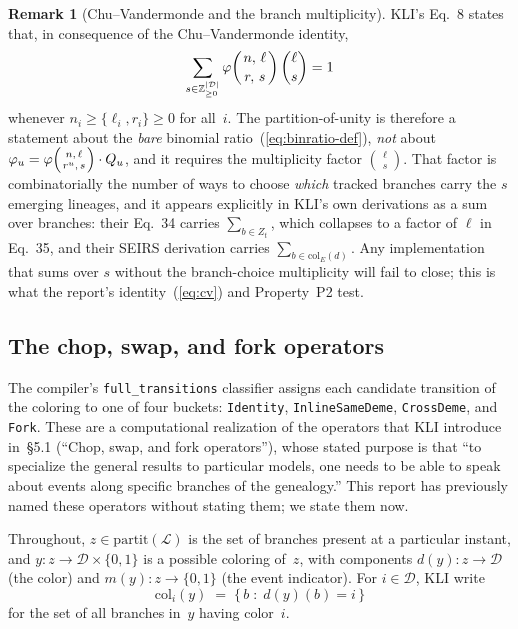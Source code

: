 \documentclass[11pt,leqno]{article}
\newcommand{\Demes}{\mathcal{D}}    %
\newcommand{\Zp}{\mathbb{Z}_{\ge 0}}
\newcommand{\binratio}[4]{\varphi\!\left(\genfrac{}{}{0pt}{}{#1,\,#2}{#3,\,#4}\right)}
\newcommand{\code}[1]{\texttt{#1}}
\theoremstyle{plain}
\theoremstyle{definition}
\newtheorem{remark}[theorem]{Remark}
\begin{document}
\begin{remark}[Chu--Vandermonde and the branch multiplicity]
\label{rem:cv}
KLI's Eq.~8 states that, in consequence of the Chu--Vandermonde
identity,
\[
  \sum_{s \in \Zp^{|\Demes|}}
  \binratio{n}{\ell}{r}{s} \binom{\ell}{s} = 1
\]
whenever $n_i \ge \{\ell_i, r_i\} \ge 0$ for all~$i$.  The
partition-of-unity is therefore a statement about the \emph{bare}
binomial ratio~(\ref{eq:binratio-def}), \emph{not} about
$\varphi_u = \binratio{n}{\ell}{r^u}{s}\cdot Q_u$, and it requires the
multiplicity factor $\binom{\ell}{s}$.  That factor is combinatorially
the number of ways to choose \emph{which} tracked branches carry the
$s$ emerging lineages, and it appears explicitly in KLI's own
derivations as a sum over branches: their Eq.~34 carries
$\sum_{b \in Z_t}$, which collapses to a factor of $\ell$ in Eq.~35,
and their SEIRS derivation carries
$\sum_{b \in \mathrm{col}_E(d)}$.  Any implementation that sums over
$s$ without the branch-choice multiplicity will fail to close;
this is what the report's identity~(\ref{eq:cv}) and Property~P2 test.
\end{remark}

\subsection{The chop, swap, and fork operators}
\label{sec:operators}

The compiler's \code{full\_transitions} classifier assigns each
candidate transition of the coloring to one of four buckets:
\code{Identity}, \code{InlineSameDeme}, \code{CrossDeme}, and
\code{Fork}.  These are a computational realization of the operators
that KLI introduce in~\S5.1 (``Chop, swap, and fork operators''), whose
stated purpose is that ``to specialize the general results to
particular models, one needs to be able to speak about events along
specific branches of the genealogy.''  This report has previously named
these operators without stating them; we state them now.

Throughout, $z \in \mathrm{partit}(\mathcal{L})$ is the set of
branches present at a particular instant, and
$y : z \to \Demes \times \{0,1\}$ is a possible coloring of~$z$, with
components $d(y) : z \to \Demes$ (the color) and
$m(y) : z \to \{0,1\}$ (the event indicator).  For $i \in \Demes$,
KLI write
\[
  \mathrm{col}_i(y) \;=\; \{\, b \;:\; d(y)(b) = i \,\}
\]
for the set of all branches in~$y$ having color~$i$.
\end{document}
